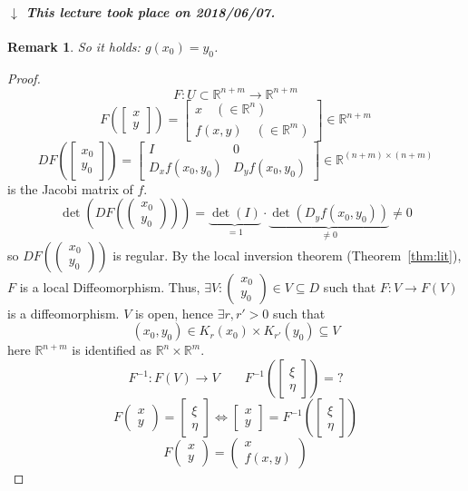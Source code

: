 \documentclass{article}
\newtheorem{remark}{Remark}  \numberwithin{remark}{section}
\newcommand{\dateref}[1]{%
  \begin{mdframed}[backgroundcolor=gray!10,innerbottommargin=0pt,innertopmargin=0pt]
    \paragraph{\textit{$\downarrow$ This lecture took place on #1.}}%
  \end{mdframed}%
}
\newcommand{\vectwo}[2]{\begin{pmatrix} #1 \\ #2 \end{pmatrix}}
\begin{document}
\dateref{2018/06/07}

\begin{remark}
  So it holds: $g(x_0) = y_0$.
\end{remark}

\begin{proof}
  \label{proof:ift}
  \[ F: U \subset \mathbb R^{n + m} \to \mathbb R^{n + m} \]
  \[
    F\left(\begin{bmatrix} x \\ y \end{bmatrix}\right)
    = \begin{bmatrix} x \quad (\in \mathbb R^{n}) \\ f(x,y)  \quad (\in \mathbb R^m)\end{bmatrix} \in \mathbb R^{n + m}
  \] \[
    DF\left(\begin{bmatrix} x_0 \\ y_0 \end{bmatrix}\right) = \begin{bmatrix}
      I & 0 \\
      D_x f(x_0, y_0) & D_y f(x_0, y_0)
    \end{bmatrix}
    \in \mathbb R^{(n + m) \times (n + m)}
  \]
  is the Jacobi matrix of $f$.
  \[ \det\left(DF(\vectwo{x_0}{y_0})\right) = \underbrace{\det(I)}_{= 1} \cdot \underbrace{\det(D_yf(x_0, y_0))}_{\neq 0} \neq 0 \]
  so $DF(\vectwo{x_0}{y_0})$ is regular. By the local inversion theorem (Theorem~\ref{thm:lit}), $F$ is a local Diffeomorphism.
  Thus, $\exists V: \vectwo{x_0}{y_0} \in V \subseteq D$ such that $F: V \to F(V)$ is a diffeomorphism.
  $V$ is open, hence $\exists r, r' > 0$ such that
  \[ (x_0, y_0) \in K_r(x_0) \times K_{r'}(y_0) \subseteq V \]
  here $\mathbb R^{n + m}$ is identified as $\mathbb R^n \times \mathbb R^m$.
  \[ F^{-1}: F(V) \to V \qquad F^{-1}(\begin{bmatrix} \xi \\ \eta \end{bmatrix}) = \text{?} \]
  \[ F\vectwo xy = \begin{bmatrix} \xi \\ \eta \end{bmatrix} \iff \begin{bmatrix} x \\ y \end{bmatrix} = F^{-1}(\begin{bmatrix} \xi \\ \eta \end{bmatrix}) \]
  \[ F\vectwo xy = \vectwo{x}{f(x,y)} \]

\end{proof}
\end{document}
